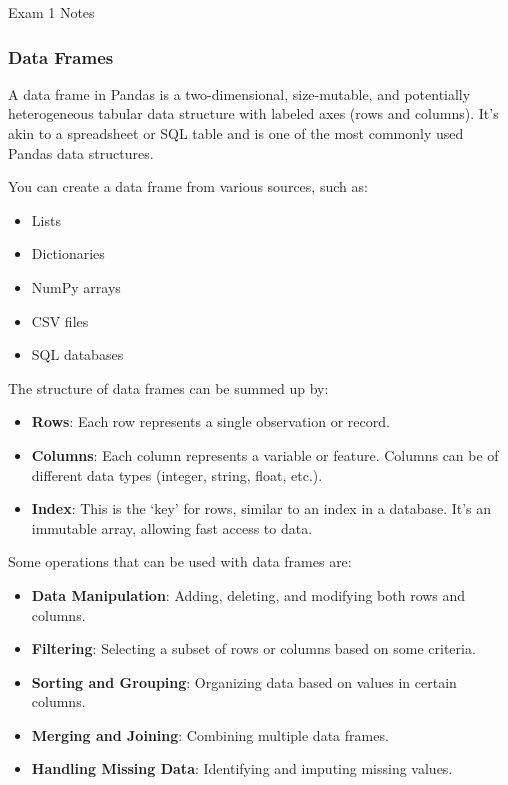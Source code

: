 \begin{examnotes}{Exam 1 Notes}
    \subsubsection*{Data Frames}

    A data frame in Pandas is a two-dimensional, size-mutable, and potentially heterogeneous tabular data structure with labeled axes (rows and columns). It's akin to a spreadsheet or SQL table and 
    is one of the most commonly used Pandas data structures.

    You can create a data frame from various sources, such as:

    \begin{itemize}
        \item Lists
        \item Dictionaries
        \item NumPy arrays
        \item CSV files
        \item SQL databases
    \end{itemize}

    The structure of data frames can be summed up by:

    \begin{itemize}
        \item \textbf{Rows}: Each row represents a single observation or record.
        \item \textbf{Columns}: Each column represents a variable or feature. Columns can be of different data types (integer, string, float, etc.).
        \item \textbf{Index}: This is the `key' for rows, similar to an index in a database. It’s an immutable array, allowing fast access to data.
    \end{itemize}

    Some operations that can be used with data frames are:

    \begin{itemize}
        \item \textbf{Data Manipulation}: Adding, deleting, and modifying both rows and columns.
        \item \textbf{Filtering}: Selecting a subset of rows or columns based on some criteria.
        \item \textbf{Sorting and Grouping}: Organizing data based on values in certain columns.
        \item \textbf{Merging and Joining}: Combining multiple data frames.
        \item \textbf{Handling Missing Data}: Identifying and imputing missing values.
    \end{itemize}


\end{examnotes}
